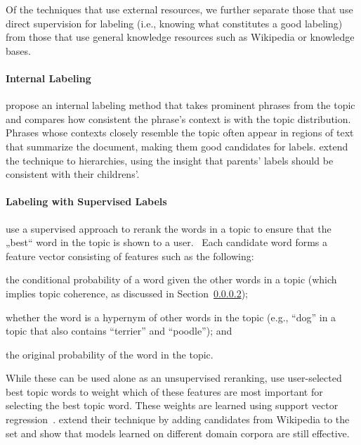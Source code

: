 Of the techniques that use external resources, we further separate
those that use direct supervision for labeling (i.e., knowing what
constitutes a good labeling) from those that use general knowledge
resources such as Wikipedia or knowledge bases.

\paragraph{Internal Labeling}

\citet{mei-07} propose an internal labeling method that takes
prominent phrases from the topic and compares how consistent the
phrase's context is with the topic distribution.  Phrases whose
contexts closely resemble the topic often appear in regions of text
that summarize the document, making them good candidates for labels.
\cite{mao-12} extend the technique to hierarchies, using the insight
that parents’ labels should be consistent with their childrens'.



\paragraph{Labeling with Supervised Labels}


\citet{lau-10} use a supervised approach to rerank the words in a
topic to ensure that the „best“ word in the topic is shown to a
user.  Each candidate word forms a feature vector consisting of
features such as the following:
\begin{itemize*}
\item the conditional probability of a word given the other words in a
  topic (which implies topic coherence, as discussed in Section~\ref{});
\item whether the word is a hypernym of other words in the topic
  (e.g., ``dog'' in a topic that also contains ``terrier'' and
  ``poodle''); and
\item the original probability of the word in the topic.
\end{itemize*}

While these can be used alone as an unsupervised reranking,
\citet{lau-10} use user-selected best topic words to weight which of
these features are most important for selecting the best topic word.
These weights are learned using support vector regression~\cite{}.
\citet{lau-11} extend their technique by adding candidates from
Wikipedia to the set and show that models learned on different domain
corpora are still effective.

